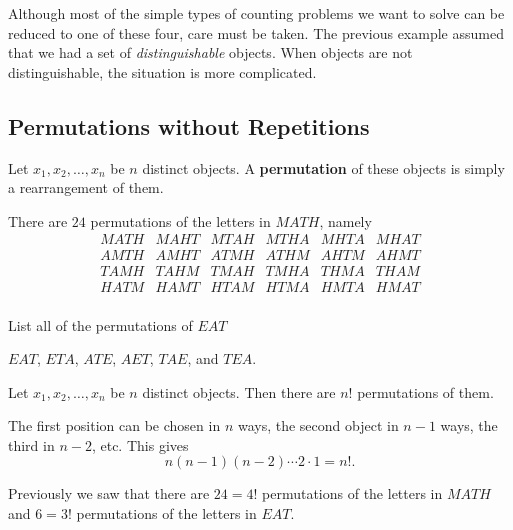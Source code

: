 Although most of the simple types of counting problems we want to solve can be reduced to 
one of these four, care must be taken.  The previous example assumed that we had a set of
{\em distinguishable} objects.  When objects are not distinguishable, the situation is more complicated.  

\subsection{Permutations without Repetitions}

\begin{df}
Let $x_1, x_2, \ldots , x_n$ be $n$ distinct objects. A {\bf permutation} 
of these objects is simply a rearrangement of them.
\end{df}
\begin{exa}
There are $24$ permutations of the letters in $MATH$, namely
$$\begin{array}{llllll} MATH & MAHT & MTAH & MTHA & MHTA &  MHAT\\
 AMTH & AMHT & ATMH & ATHM & AHTM &  AHMT\\
  TAMH & TAHM & TMAH & TMHA & THMA &  THAM\\
   HATM & HAMT & HTAM & HTMA & HMTA &  HMAT\\       
\end{array}   
$$
\end{exa}

\begin{exer}
List all of the permutations of $EAT$

\noindent
\answerlinetwo
\begin{answer}
$EAT$, $ETA$, $ATE$, $AET$, $TAE$, and $TEA$.
\end{answer}
\end{exer}


\begin{thm}\label{thm:counting_permutations}
Let $x_1, x_2, \ldots , x_n$ be $n$ distinct objects. Then there are
$n!$ permutations of them.
\begin{pf}
The first position can be chosen in $n$ ways, the second object in
$n - 1$ ways, the third in $n - 2$, etc. This gives $$n(n-1)(n-2)
\cdots 2\cdot 1 = n!.
$$
\end{pf}
\end{thm}

\begin{exa}
Previously we saw that there are $24=4!$ permutations of the letters in $MATH$ and
$6=3!$ permutations of the letters in $EAT$.
\end{exa}

